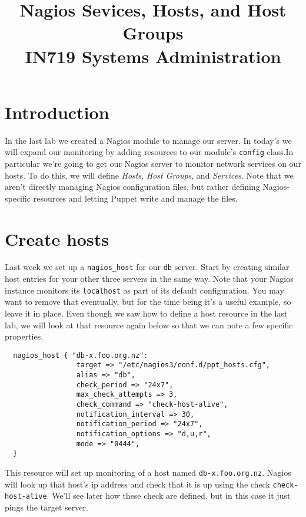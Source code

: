 \documentclass{article}         %
\title{Nagios Sevices, Hosts, and Host Groups\\ IN719 Systems Administration}
\date{}                                                 %
\begin{document}
\maketitle


\section*{Introduction}
In the last lab we created a Nagios module to manage our server. In today's we will expand our monitoring by adding resources to our module's \texttt{config} class.In particular we're going to get our Nagios server to monitor network services on our hosts. To do this, we will define \emph{Hosts}, \emph{Host Groups}, and \emph{Services}. Note that we aren't directly managing Nagios configuration files, but rather defining Nagios-specific resources and letting Puppet write and manage the files. 

\section{Create hosts}
Last week we set up a \texttt{nagios\_host} for our \texttt{db} server. Start by creating similar host entries for your other three servers in the same way. Note that your Nagios instance monitors its \texttt{localhost} as part of its default configuration. You may want to remove that eventually, but for the time being it's a useful example, so leave it in place. Even though we saw how to define a host resource in the last lab, we will look at that resource again below so that we can note a few specific properties.

\begin{verbatim}
  nagios_host { "db-x.foo.org.nz":
                 target => "/etc/nagios3/conf.d/ppt_hosts.cfg",
                 alias => "db",
                 check_period => "24x7",
                 max_check_attempts => 3,
                 check_command => "check-host-alive",
                 notification_interval => 30,
                 notification_period => "24x7",
                 notification_options => "d,u,r",
                 mode => "0444",
  }
\end{verbatim}

This resource will set up monitoring of a host named \texttt{db-x.foo.org.nz}. Nagios will look up that host's ip address and check that it is up using the check \texttt{check-host-alive}. We'll see later how these check are defined, but in this case it just pings the target server.
\end{document}
